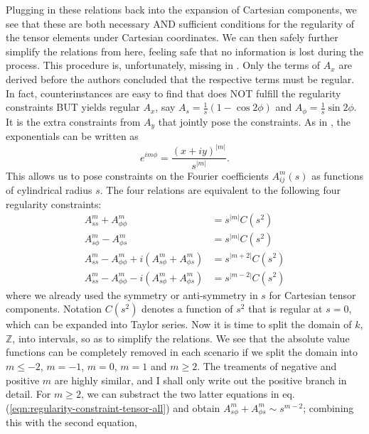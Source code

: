 Plugging in these relations back into the expansion of Cartesian components, we see that these are both necessary AND sufficient conditions for the regularity of the tensor elements under Cartesian coordinates. We can then safely further simplify the relations from here, feeling safe that no information is lost during the process. This procedure is, unfortunately, missing in \textcite{lewis_physical_1990}. Only the terms of $A_x$ are derived before the authors concluded that the respective terms must be regular. In fact, counterinstances are easy to find that does NOT fulfill the regularity constraints BUT yields regular $A_x$, say $A_s = \frac{1}{s} \left(1 - \cos 2\phi\right)$ and $A_\phi = \frac{1}{s} \sin 2\phi$. It is the extra constraints from $A_y$ that jointly pose the constraints. As in \textcite{lewis_physical_1990}, the exponentials can be written as
\[
    e^{im\phi} = \frac{\left(x + iy\right)^{|m|}}{s^{|m|}}.
\]
This allows us to pose constraints on the Fourier coefficients $A_{ij}^m(s)$ as functions of cylindrical radius $s$. The four relations are equivalent to the following four regularity constraints:
\begin{equation}\label{eqn:regularity-constraint-tensor-all}
\begin{aligned}
    A_{ss}^m + A_{\phi\phi}^m &= s^{|m|} C(s^2) \\ 
    A_{s\phi}^m - A_{\phi s}^m &= s^{|m|} C(s^2) \\ 
    A_{ss}^m - A_{\phi\phi}^m + i \left(A_{s\phi}^m + A_{\phi s}^m\right) &= s^{|m+2|} C(s^2) \\ 
    A_{ss}^m - A_{\phi\phi}^m - i \left(A_{s\phi}^m + A_{\phi s}^m\right) &= s^{|m-2|} C(s^2)
\end{aligned}
\end{equation}
where we already used the symmetry or anti-symmetry in $s$ for Cartesian tensor components. Notation $C(s^2)$ denotes a function of $s^2$ that is regular at $s=0$, which can be expanded into Taylor series. Now it is time to split the domain of $k$, $\mathbb{Z}$, into intervals, so as to simplify the relations. We see that the absolute value functions can be completely removed in each scenario if we split the domain into $m \leq -2$, $m=-1$, $m=0$, $m=1$ and $m\geq 2$. The treaments of negative and positive $m$ are highly similar, and I shall only write out the positive branch in detail. For $m\geq 2$, we can substract the two latter equations in eq.(\ref{eqn:regularity-constraint-tensor-all}) and obtain $A_{s\phi}^m + A_{\phi s}^m \sim s^{m-2}$; combining this with the second equation,
